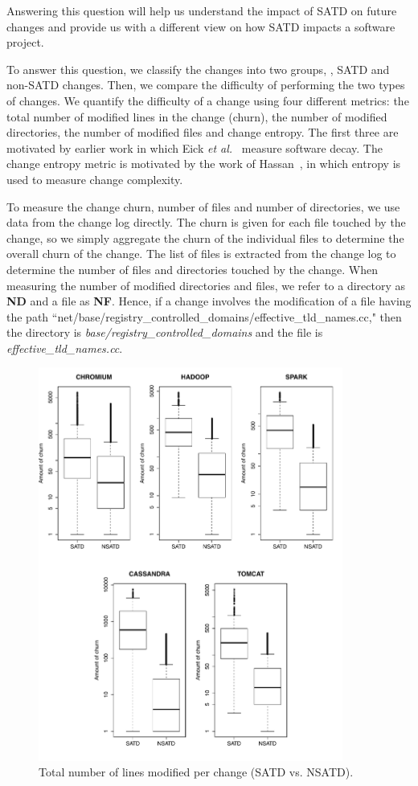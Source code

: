 Answering this question will help us understand the impact of SATD on future changes and provide us with a different view on how SATD impacts a software project.


  To answer this question, we classify the changes into two groups, \ie{}, SATD and non-SATD changes. Then, we compare the difficulty of performing the two types of changes. We quantify the difficulty of a change using four different metrics: the total number of modified lines in the change (churn), the number of modified directories, the number of modified files and change entropy. The first three are motivated by earlier work in which Eick \emph{et al.}~\cite{eick2001decay} measure software decay. The change entropy metric is motivated by the work of Hassan~\cite{hassan2009predicting}, in which entropy is used to measure change complexity.



To measure the change churn, number of files and number of directories, we use data from the change log directly. The churn is given for each file touched by the change, so we simply aggregate the churn of the individual files to determine the overall churn of the change. The list of files is extracted from the change log to determine the number of files and directories touched by the change. When measuring the number of modified  directories and files, we refer to a directory as \textbf{ND} and  a file as \textbf{NF}. Hence, if a change involves the modification of a file having the path ``net/base/registry\_controlled\_domains/effective\_tld\_names.cc," then the directory is \textit{base/registry\_controlled\_domains} and the file is \textit{effective\_tld\_names.cc}.



\begin{figure}[!hp]
	\centering
	\includegraphics[width=100mm]{figures/chapter3/churn_for_all_projects}
	\caption{Total number of lines modified per change (SATD vs. NSATD).}
	\label{figure:tlcpc}
\end{figure}




